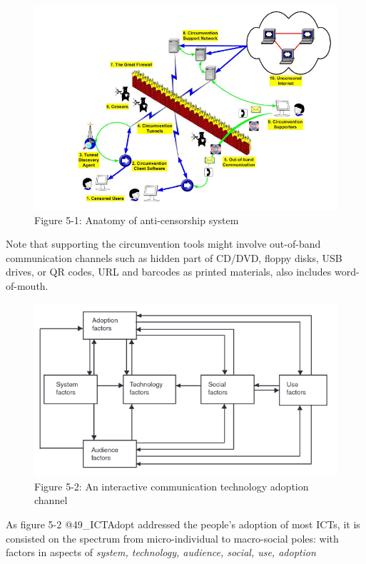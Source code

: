 \begin{figure}
\centering
\includegraphics{./res/5.1-anatomy.png}
\caption{Figure 5-1: Anatomy of anti-censorship system}
\end{figure}

Note that supporting the circumvention tools might involve out-of-band
communication channels such as hidden part of CD/DVD, floppy disks, USB
drives, or QR codes, URL and barcodes as printed materials, also
includes word-of-mouth.

\begin{figure}
\centering
\includegraphics{./res/5.2-adoption.png}
\caption{Figure 5-2: An interactive communication technology adoption
channel}
\end{figure}

As figure 5-2 @49\_ICTAdopt addressed the people's adoption of most
ICTs, it is consisted on the spectrum from micro-individual to
macro-social poles: with factors in aspects of \emph{system, technology,
audience, social, use, adoption}

